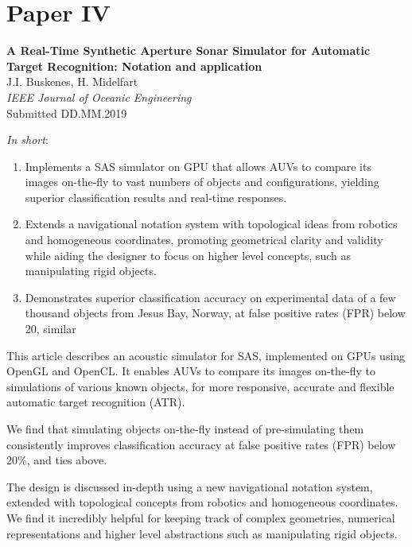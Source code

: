 \section{Paper IV}\label{sec:paperIV} %
\textbf{A Real-Time Synthetic Aperture Sonar Simulator for Automatic Target Recognition: Notation and application}\\
J.I. Buskenes, H. Midelfart\\
\textit{IEEE Journal of Oceanic Engineering}\\
Submitted DD.MM.2019%

\textit{In short}:
\begin{enumerate}
\item Implements a SAS simulator on GPU that allows AUVs to compare its images on-the-fly to vast numbers of objects and configurations, yielding superior classification results and real-time responses.
\item Extends a navigational notation system with topological ideas from robotics and homogeneous coordinates, promoting geometrical clarity and validity while aiding the designer to focus on higher level concepts, such as manipulating rigid objects.
\item Demonstrates superior classification accuracy on experimental data of a few thousand objects from Jesus Bay, Norway, at false positive rates (FPR) below 20, similar %
\end{enumerate}

This article describes an acoustic simulator for SAS, implemented on GPUs using OpenGL and OpenCL. It enables AUVs to compare its images on-the-fly to simulations of various known objects, for more responsive, accurate and flexible automatic target recognition (ATR).

We find that simulating objects on-the-fly instead of pre-simulating them consistently improves classification accuracy at false positive rates (FPR) below 20\%, and ties above. 

The design is discussed in-depth using a new navigational notation system, extended with topological concepts from robotics and homogeneous coordinates. We find it incredibly helpful for keeping track of complex geometries, numerical representations and higher level abstractions such as manipulating rigid objects. 



